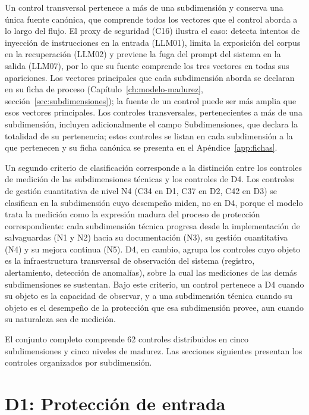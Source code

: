 Un control transversal pertenece a más de una subdimensión y conserva una única fuente canónica, que comprende todos los vectores que el control aborda a lo largo del flujo. El proxy de seguridad (C16) ilustra el caso: detecta intentos de inyección de instrucciones en la entrada (LLM01), limita la exposición del corpus en la recuperación (LLM02) y previene la fuga del prompt del sistema en la salida (LLM07), por lo que su fuente comprende los tres vectores en todas sus apariciones. Los vectores principales que cada subdimensión aborda se declaran en su ficha de proceso (Capítulo~\ref{ch:modelo-madurez}, sección~\ref{sec:subdimensiones}); la fuente de un control puede ser más amplia que esos vectores principales. Los controles transversales, pertenecientes a más de una subdimensión, incluyen adicionalmente el campo Subdimensiones, que declara la totalidad de su pertenencia; estos controles se listan en cada subdimensión a la que pertenecen y su ficha canónica se presenta en el Apéndice~\ref{app:fichas}.

Un segundo criterio de clasificación corresponde a la distinción entre los controles de medición de las subdimensiones técnicas y los controles de D4. Los controles de gestión cuantitativa de nivel N4 (C34 en D1, C37 en D2, C42 en D3) se clasifican en la subdimensión cuyo desempeño miden, no en D4, porque el modelo trata la medición como la expresión madura del proceso de protección correspondiente: cada subdimensión técnica progresa desde la implementación de salvaguardas (N1 y N2) hacia su documentación (N3), su gestión cuantitativa (N4) y su mejora continua (N5). D4, en cambio, agrupa los controles cuyo objeto es la infraestructura transversal de observación del sistema (registro, alertamiento, detección de anomalías), sobre la cual las mediciones de las demás subdimensiones se sustentan. Bajo este criterio, un control pertenece a D4 cuando su objeto es la capacidad de observar, y a una subdimensión técnica cuando su objeto es el desempeño de la protección que esa subdimensión provee, aun cuando su naturaleza sea de medición.

El conjunto completo comprende 62 controles distribuidos en cinco subdimensiones y cinco niveles de madurez. Las secciones siguientes presentan los controles organizados por subdimensión.

\section{D1: Protección de entrada}
\label{sec:controles-d1}

